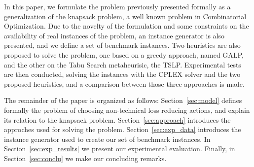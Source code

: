 In this paper, we formulate the problem previously presented formally as a generalization of the knapsack problem, a well known problem in 
Combinatorial Optimization. Due to the novelty of the formulation and some constraints on the availability of real instances of the problem, 
an instance generator is also presented, and we define a set of benchmark instances. Two heuristics are also proposed to solve the problem, one based on a greedy approach, 
named GALP, and the other on the Tabu Search metaheurisic, the TSLP. Experimental tests are then conducted, solving the instances with the CPLEX solver and the two proposed
heuristics, and a comparison between those three approaches is made.

The remainder of the paper is organized as follows: Section~\ref{sec:model} defines formally the
problem of choosing non-technical loss reducing actions, and explain its relation to the knapsack problem.
Section~\ref{sec:approach} introduces the approches used for solving the problem.
Section~\ref{sec:exp_data} introduces the instance generator used to create our set of benchmark instances. 
In Section~\ref{sec:exp_results} we present our experimental evaluation. Finally, in Section~\ref{sec:conclu} 
we make our concluding remarks.
